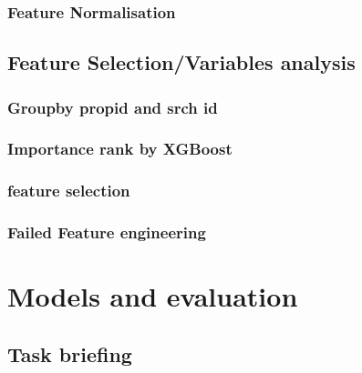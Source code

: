 \documentclass[runningheads]{llncs}
\begin{document}
        \subsubsection{Feature Normalisation}
        
        
    \subsection{Feature Selection/Variables analysis}
        
        \subsubsection{Groupby propid and srch id}
        
        \subsubsection{Importance rank by XGBoost}
        
        
        \subsubsection{feature selection}
        
        
        
    \subsubsection{Failed Feature engineering}
        
        

\section{Models and evaluation}
\subsection{Task briefing}
\end{document}

